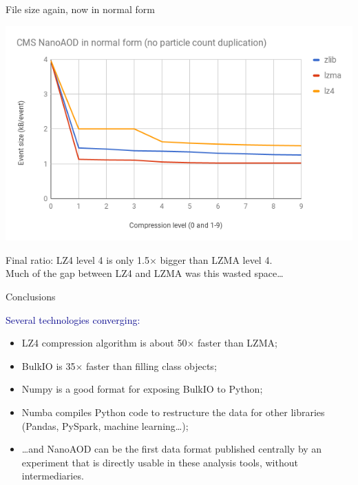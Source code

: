\documentclass{beamer}
\begin{document}
\begin{frame}{File size again, now in normal form}
\begin{center}
\includegraphics[width=\linewidth]{final-size.png}
\end{center}

Final ratio: LZ4 level 4 is only 1.5$\times$ bigger than LZMA level 4. \\
Much of the gap between LZ4 and LZMA was this wasted space\ldots
\end{frame}

\begin{frame}{Conclusions}
\vspace{0.5 cm}

\textcolor{darkblue}{Several technologies converging:}
\begin{itemize}\setlength{\itemsep}{0.25 cm}
\item LZ4 compression algorithm is about 50$\times$ faster than LZMA;
\item BulkIO is 35$\times$ faster than filling class objects;
\item Numpy is a good format for exposing BulkIO to Python;
\item Numba compiles Python code to restructure the data for other libraries (Pandas, PySpark, machine learning\ldots);
\end{itemize}

\vspace{1 cm}
\begin{itemize}
\item<2-> \ldots and NanoAOD can be the first data format published centrally by an experiment that is directly usable in these analysis tools, without intermediaries.
\end{itemize}
\end{frame}
\end{document}
